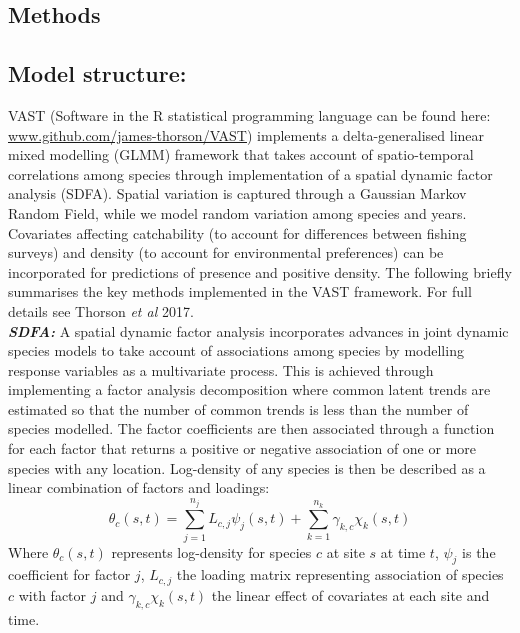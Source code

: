 \documentclass[fleqn,10pt]{wlscirep}
\begin{document}
\begin{linenumbers}
\section*{Methods\\}

\subsection*{Model structure:\\} 

VAST (Software in the R statistical programming language can be found here:
\url{www.github.com/james-thorson/VAST}) implements a delta-generalised linear
mixed modelling (GLMM) framework that takes account of spatio-temporal
correlations among species through implementation of a spatial dynamic factor
analysis (SDFA). Spatial variation is captured through a Gaussian Markov Random
Field, while we model random variation among species and years. Covariates
affecting catchability (to account for differences between fishing surveys) and
density (to account for environmental preferences) can be incorporated for
predictions of presence and positive density. The following briefly summarises
the key methods implemented in the VAST framework. For full details see Thorson
\textit{et al} 2017\cite{Thorson2017}.\\

\textbf{\textit{SDFA:}} A spatial dynamic factor analysis incorporates advances
in joint dynamic species models\cite{Thorson2017} to take account of
associations among species by modelling response variables as a
multivariate process. This is achieved through implementing a factor analysis
decomposition where common latent trends are estimated so that the number of
common trends is less than the number of species modelled. The factor
coefficients are then associated through a function for each factor that
returns a positive or negative association of one or more species with any
location. Log-density of any species is then be described as a linear
combination of factors and loadings:
	\begin{equation}
		\theta_{c}(s,t) = \sum_{j=1}^{n_{j}}
		L_{c,j}\psi_{j}(s,t) +\sum_{k=1}^{n_{k}}
		\gamma_{k,c}\chi_{k}(s,t)
	\end{equation}
Where $\theta_{c}(s,t)$ represents log-density for species $c$ at site $s$ at
time $t$, $\psi_{j}$ is the coefficient for factor $j$, $L_{c,j}$ the loading
matrix representing association of species $c$ with factor $j$ and
$\gamma_{k,c}\chi_{k}(s,t)$ the linear effect of covariates at each site and
time\cite{Thorson2016b}. \\


\end{linenumbers}
\end{document}
